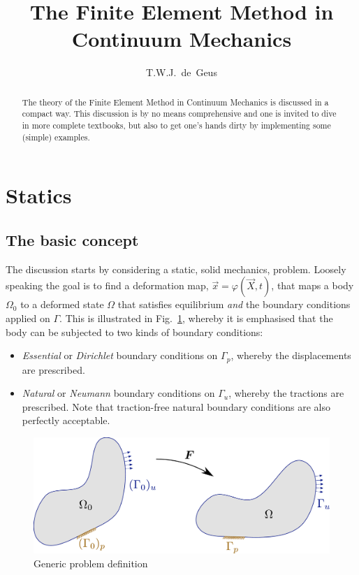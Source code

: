 \documentclass[times,namecite]{goose-article}
\title{%
  The Finite Element Method in Continuum Mechanics
}
\author{T.W.J.~de~Geus}
\begin{document}
\maketitle

\begin{abstract}
The theory of the Finite Element Method in Continuum Mechanics is discussed in a compact way. This discussion is by no means comprehensive and one is invited to dive in more complete textbooks, but also to get one's hands dirty by implementing some (simple) examples.
\end{abstract}

\setcounter{tocdepth}{2}
\tableofcontents

\section{Statics}

\subsection{The basic concept}

The discussion starts by considering a static, solid mechanics, problem. Loosely speaking the goal is to find a deformation map, $\vec{x} = \varphi(\vec{X},t)$, that maps a body $\Omega_0$ to a deformed state $\Omega$ that satisfies equilibrium \emph{and} the boundary conditions applied on $\Gamma$. This is illustrated in Fig.~\ref{fig:problem}, whereby it is emphasised that the body can be subjected to two kinds of boundary conditions:
\begin{itemize}
  \item \emph{Essential} or \emph{Dirichlet} boundary conditions on $\Gamma_p$, whereby the displacements are prescribed.
  \item \emph{Natural} or \emph{Neumann} boundary conditions on $\Gamma_u$, whereby the tractions are prescribed. Note that traction-free natural boundary conditions are also perfectly acceptable.
\end{itemize}

\begin{figure}[htp]
  \centering
  \includegraphics[width=.5\textwidth]{figures/problem.pdf}
  \caption{Generic problem definition}
  \label{fig:problem}
\end{figure}
\end{document}

